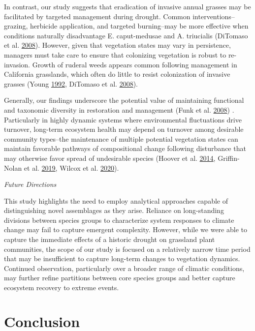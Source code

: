 \documentclass[twoside,12pt,final]{ucthesis-CA2012}
\begin{document}
\begin{ucmainmatter}
In contrast, our study suggests that eradication of invasive annual grasses may be facilitated by targeted management during drought.
Common interventions--grazing, herbicide application, and targeted burning--may be more effective when conditions naturally disadvantage E. caput-medusae and A. triucialis (DiTomaso et al. \protect\hyperlink{ref-DiTomaso2008}{2008}).
However, given that vegetation states may vary in persistence, managers must take care to ensure that colonizing vegetation is robust to re-invasion.
Growth of ruderal weeds appears common following management in California grasslands, which often do little to resist colonization of invasive grasses (Young \protect\hyperlink{ref-Young1992}{1992}, DiTomaso et al. \protect\hyperlink{ref-DiTomaso2008}{2008}).

Generally, our findings underscore the potential value of maintaining functional and taxonomic diversity in restoration and management (Funk et al. \protect\hyperlink{ref-Funk2008}{2008}) .
Particularly in highly dynamic systems where environmental fluctuations drive turnover, long-term ecosystem health may depend on turnover among desirable community types--the maintenance of multiple potential vegetation states can maintain favorable pathways of compositional change following disturbance that may otherwise favor spread of undesirable species (Hoover et al. \protect\hyperlink{ref-Hoover2014}{2014}, Griffin-Nolan et al. \protect\hyperlink{ref-Griffin-Nolan2019}{2019}, Wilcox et al. \protect\hyperlink{ref-Wilcox2020}{2020}).

\emph{Future Directions}

This study highlights the need to employ analytical approaches capable of distinguishing novel assemblages as they arise.
Reliance on long-standing divisions between species groups to characterize system responses to climate change may fail to capture emergent complexity.
However, while we were able to capture the immediate effects of a historic drought on grassland plant communities, the scope of our study is focused on a relatively narrow time period that may be insufficient to capture long-term changes to vegetation dynamics.
Continued observation, particularly over a broader range of climatic conditions, may further refine partitions between core species groups and better capture ecosystem recovery to extreme events.

\hypertarget{conclusion}{%
\chapter*{Conclusion}\label{conclusion}}


\end{ucmainmatter}
\end{document}
